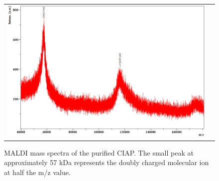 
\begin{figure}[t]
\begin{center}
\begin{tabular}{cc}
    \includegraphics[scale=0.5]{ciapmaldi.PNG}
\end{tabular}
\end{center}
\caption{
MALDI mass spectra of the purified CIAP. The small peak at approximately 57 kDa represents the doubly charged molecular ion at half the m/z value.
} 
	\label{maldi}
\end{figure}

